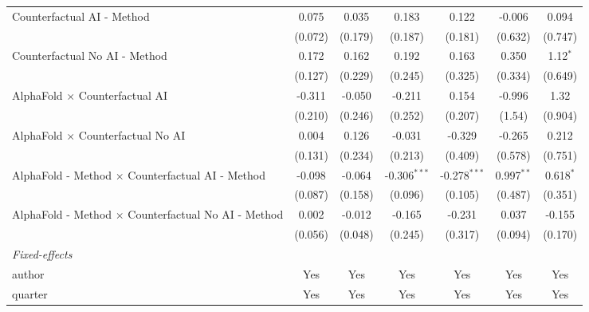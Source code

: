 \begin{tabular}{lcccccc}
   Counterfactual AI - Method                                 & 0.075        & 0.035   & 0.183          & 0.122          & -0.006       & 0.094\\   
                                                              & (0.072)      & (0.179) & (0.187)        & (0.181)        & (0.632)      & (0.747)\\   
   Counterfactual No AI - Method                              & 0.172        & 0.162   & 0.192          & 0.163          & 0.350        & 1.12$^{*}$\\   
                                                              & (0.127)      & (0.229) & (0.245)        & (0.325)        & (0.334)      & (0.649)\\   
   AlphaFold $\times$ Counterfactual AI                       & -0.311       & -0.050  & -0.211         & 0.154          & -0.996       & 1.32\\   
                                                              & (0.210)      & (0.246) & (0.252)        & (0.207)        & (1.54)       & (0.904)\\   
   AlphaFold $\times$ Counterfactual No AI                    & 0.004        & 0.126   & -0.031         & -0.329         & -0.265       & 0.212\\   
                                                              & (0.131)      & (0.234) & (0.213)        & (0.409)        & (0.578)      & (0.751)\\   
   AlphaFold - Method $\times$ Counterfactual AI - Method     & -0.098       & -0.064  & -0.306$^{***}$ & -0.278$^{***}$ & 0.997$^{**}$ & 0.618$^{*}$\\   
                                                              & (0.087)      & (0.158) & (0.096)        & (0.105)        & (0.487)      & (0.351)\\   
   AlphaFold - Method $\times$ Counterfactual No AI - Method  & 0.002        & -0.012  & -0.165         & -0.231         & 0.037        & -0.155\\   
                                                              & (0.056)      & (0.048) & (0.245)        & (0.317)        & (0.094)      & (0.170)\\   
   \midrule
   \emph{Fixed-effects}\\
   author                                                     & Yes          & Yes     & Yes            & Yes            & Yes          & Yes\\  
   quarter                                                    & Yes          & Yes     & Yes            & Yes            & Yes          & Yes\\  

\end{tabular}
